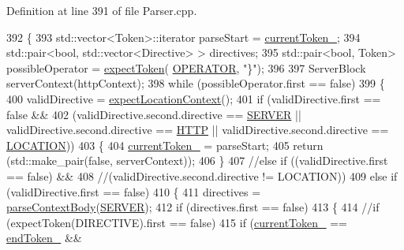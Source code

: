 Definition at line 391 of file Parser.\+cpp.


\begin{DoxyCode}
392     \{
393         std::vector<Token>::iterator parseStart = \hyperlink{classft_1_1_parser_a942c5b794d108f144c5b5028aaa34cb6}{currentToken\_};
394         std::pair<bool, std::vector<Directive> > directives;
395         std::pair<bool, Token> possibleOperator = \hyperlink{classft_1_1_parser_a1615a752d3642bb53598e2c8db810db0}{expectToken}(
      \hyperlink{namespaceft_aa520fbf142ba1e7e659590c07da31921a6411d9d6073252e4d316493506bbb979}{OPERATOR}, \textcolor{stringliteral}{"\}"});
396 
397         ServerBlock serverContext(httpContext);
398         \textcolor{keywordflow}{while} (possibleOperator.first == \textcolor{keyword}{false})
399         \{
400             validDirective = \hyperlink{classft_1_1_parser_a002b236022851df6ef2203aab9b24a73}{expectLocationContext}();
401             \textcolor{keywordflow}{if} (validDirective.first == \textcolor{keyword}{false} &&
402                  (validDirective.second.directive == \hyperlink{namespaceft_a5a5554dff10f0dc50bae4cc5825ad75da67c96b24b23bcb408bae7626730a04b7}{SERVER} || validDirective.second.directive == 
      \hyperlink{namespaceft_a5a5554dff10f0dc50bae4cc5825ad75da67e044074f46e6cea22788527da5f02e}{HTTP} || validDirective.second.directive == \hyperlink{namespaceft_a5a5554dff10f0dc50bae4cc5825ad75da1e9e3944b93fde52c7c92e1e15dcaf4a}{LOCATION}))
403             \{
404                 \hyperlink{classft_1_1_parser_a942c5b794d108f144c5b5028aaa34cb6}{currentToken\_} = parseStart;
405                 \textcolor{keywordflow}{return} (std::make\_pair(\textcolor{keyword}{false}, serverContext));
406             \}
407             \textcolor{comment}{//else if ((validDirective.first == false) &&}
408                      \textcolor{comment}{//(validDirective.second.directive != LOCATION))}
409             \textcolor{keywordflow}{else} \textcolor{keywordflow}{if} (validDirective.first == \textcolor{keyword}{false})
410             \{
411                 directives = \hyperlink{classft_1_1_parser_a2d0fd9222eca5d8ea7e8fbb79f0a30be}{parseContextBody}(\hyperlink{namespaceft_a5a5554dff10f0dc50bae4cc5825ad75da67c96b24b23bcb408bae7626730a04b7}{SERVER});
412                 \textcolor{keywordflow}{if} (directives.first == \textcolor{keyword}{false})
413                 \{
414                     \textcolor{comment}{//if (expectToken(DIRECTIVE).first == false)}
415                     \textcolor{keywordflow}{if} (\hyperlink{classft_1_1_parser_a942c5b794d108f144c5b5028aaa34cb6}{currentToken\_} == \hyperlink{classft_1_1_parser_a538ba3ab8ee1d0cef5cc3c999f3ab44c}{endToken\_} && 

\end{DoxyCode}
